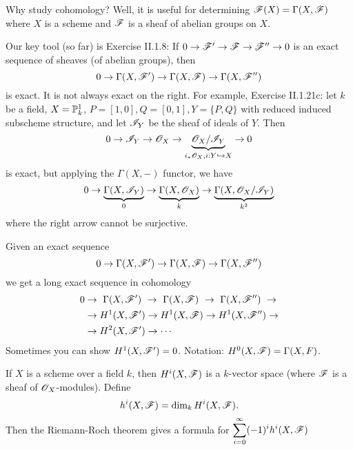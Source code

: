  \setcounter{lecture}{1}

\def\A{\mathcal{A}}


Why study cohomology?  Well, it is useful for determining
$\F(X)=\Gamma(X,\F)$ where $X$ is a scheme and $\F$ is a sheaf of
abelian groups on $X$.


Our key tool (so far) is Exercise II.1.8: If $0\to \F' \to \F \to
\F''\to 0$ is an exact sequence of sheaves (of abelian groups),
then
\[
    0\to \Gamma(X,\F') \to \Gamma(X,\F) \to \Gamma(X,\F'')
\]
is exact.  It is not always exact on the right.  For example,
Exercise II.1.21c: let $k$ be a field, $X=\P^1_k$,
$P=[1,0],Q=[0,1],Y=\{P,Q\}$ with reduced induced subscheme
structure, and let $\I_Y$ be the sheaf of ideals of $Y$.  Then
\[
    0\to \I_Y \to \O_X\to \underbrace{\O_X/\I_Y}_{i_*\O_X, i:Y\hookrightarrow X} \to 0
\]
is exact, but applying the $\Gamma(X,-)$ functor, we have
\[
    0\to \underbrace{\Gamma(X,\I_Y)}_0 \to
         \underbrace{\Gamma(X,\O_X)}_k \to
         \underbrace{\Gamma(X,\O_X/\I_Y)}_{k^2}
\]
where the right arrow cannot be surjective.


Given an exact sequence
\[
    0\to \Gamma(X,\F') \to \Gamma(X,\F) \to \Gamma(X,\F'')
\]
we get a long exact sequence in cohomology
\begin{align*}
0 &\to\ \Gamma(X,\F')\ \to\ \Gamma(X,\F) \ \to\ \Gamma(X,\F'')\ \to \\
  &\to H^1(X,\F') \to H^1(X,\F) \to H^1(X,\F'') \to \\
  &\to H^2(X,\F') \to \cdots \\
\end{align*}
Sometimes you can show $H^1(X,\F')=0$.  Notation: $H^0(X,\F) =
\Gamma(X,F)$.


If $X$ is a scheme over a field $k$, then $H^i(X,\F)$ is a
$k$-vector space (where $\F$ is a sheaf of $\O_X$-modules). Define
\[
    h^i(X,\F) = \dim_k H^i(X,\F).
\]
Then the Riemann-Roch theorem gives a formula for
$\displaystyle\sum_{i=0}^{\infty}(-1)^i h^i(X,\F)$

